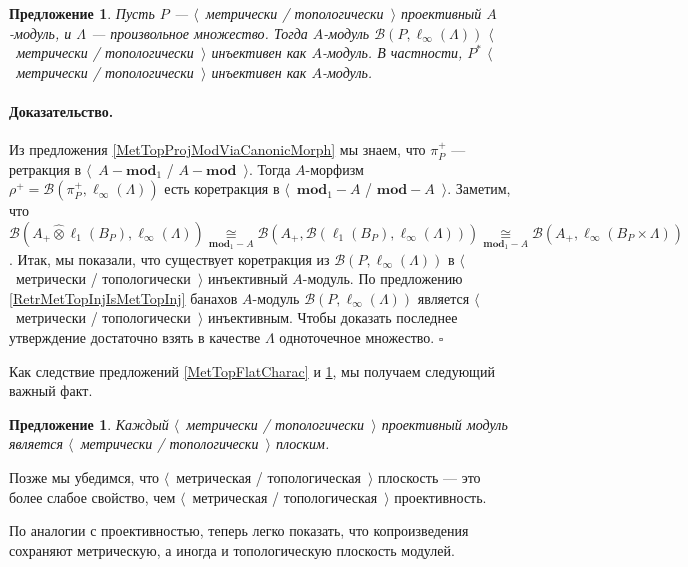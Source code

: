 \documentclass[12pt]{article}
\newcommand{\projtens}{\mathbin{\widehat{\otimes}}}
\newcommand{\isom}[1]{\mathop{\mathbin{\cong}}\limits_{#1}}
\newtheorem{proposition}[theorem]{Предложение}
\renewenvironment{proof}{\paragraph{Доказательство.}}{\hfill$\square$\medskip}
\begin{document}
\begin{proposition}\label{DualMetTopProjIsMetrInj} Пусть $P$ --- $\langle$~метрически / топологически~$\rangle$ проективный $A$-модуль, и $\Lambda$ --- произвольное множество. Тогда $A$-модуль $\mathcal{B}(P,\ell_\infty(\Lambda))$ $\langle$~метрически / топологически~$\rangle$ инъективен как $A$-модуль. В частности, $P^*$ $\langle$~метрически / топологически~$\rangle$ инъективен как $A$-модуль.
\end{proposition}
\begin{proof} Из предложения \ref{MetTopProjModViaCanonicMorph} мы знаем, что $\pi_P^+$ --- ретракция в $\langle$~$A-\mathbf{mod}_1$ / $A-\mathbf{mod}$~$\rangle$. Тогда $A$-морфизм $\rho^+=\mathcal{B}(\pi_P^+,\ell_\infty(\Lambda))$ есть коретракция в $\langle$~$\mathbf{mod}_1-A$ / $\mathbf{mod}-A$~$\rangle$. Заметим, что $\mathcal{B}(A_+\projtens\ell_1(B_P),\ell_\infty(\Lambda))\isom{\mathbf{mod}_1-A}\mathcal{B}(A_+,\mathcal{B}(\ell_1(B_P),\ell_\infty(\Lambda)))\isom{\mathbf{mod}_1-A}\mathcal{B}(A_+,\ell_\infty(B_P\times\Lambda))$. Итак, мы показали, что существует коретракция из $\mathcal{B}(P,\ell_\infty(\Lambda))$ в $\langle$~метрически / топологически~$\rangle$ инъективный $A$-модуль. По предложению \ref{RetrMetTopInjIsMetTopInj} банахов $A$-модуль $\mathcal{B}(P,\ell_\infty(\Lambda))$ является $\langle$~метрически / топологически~$\rangle$ инъективным. Чтобы доказать последнее утверждение достаточно взять в качестве $\Lambda$ одноточечное множество.
\end{proof}

Как следствие предложений \ref{MetTopFlatCharac} и \ref{DualMetTopProjIsMetrInj}, мы получаем следующий важный факт.

\begin{proposition}\label{MetTopProjIsMetTopFlat} Каждый $\langle$~метрически / топологически~$\rangle$ проективный модуль является $\langle$~метрически / топологически~$\rangle$ плоским.
\end{proposition}

Позже мы убедимся, что $\langle$~метрическая / топологическая~$\rangle$ плоскость --- это более слабое свойство, чем $\langle$~метрическая / топологическая~$\rangle$ проективность.

По аналогии с проективностью, теперь легко показать, что копроизведения сохраняют метрическую, а иногда и топологическую плоскость модулей.
\end{document}
